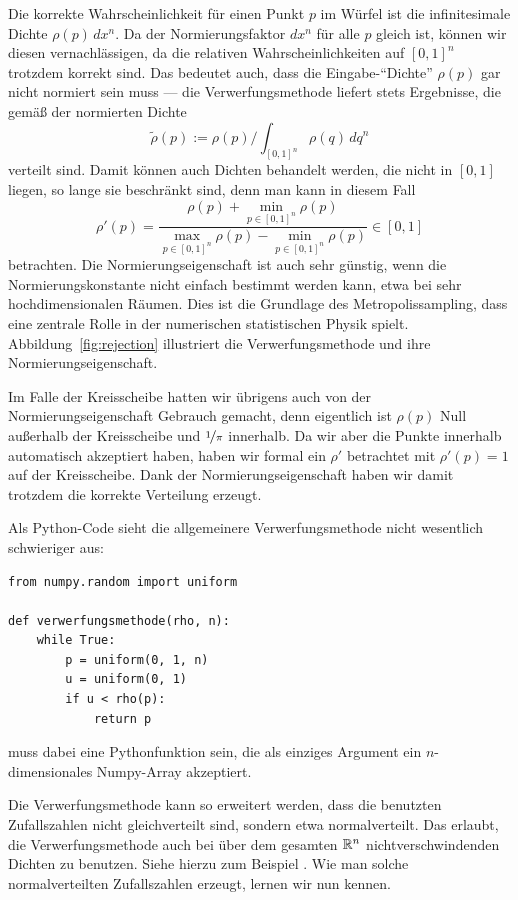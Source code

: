 Die korrekte Wahrscheinlichkeit für einen Punkt $p$ im Würfel ist die
infinitesimale Dichte $\rho(p)\,dx^n$. Da der Normierungsfaktor $dx^n$
für alle $p$ gleich ist, können wir diesen vernachlässigen, da die
relativen Wahrscheinlichkeiten auf $[0,1]^n$ trotzdem korrekt
sind. Das bedeutet auch, dass die Eingabe-"`Dichte"' $\rho(p)$ gar nicht
normiert sein muss --- die Verwerfungsmethode liefert stets
Ergebnisse, die gemäß der normierten Dichte
\begin{equation}
  \tilde\rho(p) := \rho(p) / \int_{[0,1]^n} \rho(q)\,dq^n
\end{equation}
verteilt sind. Damit können auch Dichten behandelt werden, die nicht
in $[0,1]$ liegen, so lange sie beschränkt sind, denn man kann in
diesem Fall
\begin{equation}
  \rho'(p) = \frac{\rho(p) + \min_{p\in [0,1]^n} \rho(p)}{
    \max_{p\in [0,1]^n} \rho(p) - \min_{p\in [0,1]^n} \rho(p)} \in [0,1]
\end{equation}
betrachten. Die Normierungseigenschaft ist auch sehr günstig, wenn die
Normierungskonstante nicht einfach bestimmt werden kann, etwa bei sehr
hochdimensionalen Räumen. Dies ist die Grundlage des
Metropolissampling, dass eine zentrale Rolle in der numerischen
statistischen Physik spielt. Abbildung~\ref{fig:rejection} illustriert
die Verwerfungsmethode und ihre Normierungseigenschaft.

Im Falle der Kreisscheibe hatten wir übrigens auch von der
Normierungseigenschaft Gebrauch gemacht, denn eigentlich ist $\rho(p)$
Null außerhalb der Kreisscheibe und $\nicefrac{1}{\pi}$ innerhalb. Da
wir aber die Punkte innerhalb automatisch akzeptiert haben, haben wir
formal ein $\rho'$ betrachtet mit $\rho'(p) = 1$ auf der
Kreisscheibe. Dank der Normierungseigenschaft haben wir damit trotzdem
die korrekte Verteilung erzeugt.

Als Python-Code sieht die allgemeinere Verwerfungsmethode nicht
wesentlich schwieriger aus:
\begin{lstlisting}
from numpy.random import uniform

def verwerfungsmethode(rho, n):
    while True:
        p = uniform(0, 1, n)
        u = uniform(0, 1)
        if u < rho(p):
            return p
\end{lstlisting}
 muss dabei eine Pythonfunktion sein, die als einziges
Argument ein $n$-dimensionales Numpy-Array akzeptiert.

Die Verwerfungsmethode kann so erweitert werden, dass die benutzten
Zufallszahlen  nicht gleichverteilt sind, sondern etwa
normalverteilt. Das erlaubt, die Verwerfungsmethode auch bei über dem
gesamten $\mathbb{R}^n$ nichtverschwindenden Dichten zu benutzen. Siehe
hierzu zum Beispiel \textcite{knuth81b}. Wie man solche
normalverteilten Zufallszahlen erzeugt, lernen wir nun kennen.

